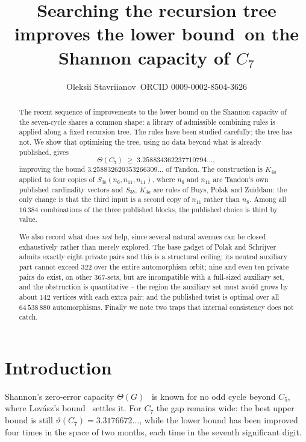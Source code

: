 \documentclass[11pt]{article}
\title{Searching the recursion tree improves the lower bound\ on the Shannon capacity of $C_7$}
\author{Oleksii Stavriianov\ \small ORCID 0009-0002-8504-3626}
\date{}
\theoremstyle{definition}
\begin{document}
\maketitle

\begin{abstract}
The recent sequence of improvements to the lower bound on the Shannon capacity of the seven-cycle
shares a common shape: a library of admissible combining rules is applied along a fixed recursion
tree. The rules have been studied carefully; the tree has not. We show that optimising the tree,
using no data beyond what is already published, gives
\[
  \Theta(C_7) \;\ge\; 3.258834362237710794\ldots,
\]
improving the bound $3.258832620353266309\ldots$ of Tandon. The construction is
$K_{4a}$ applied to four copies of $S_{3b}(n_6, n_{11}, n_{11})$, where $n_6$ and $n_{11}$ are
Tandon's own published cardinality vectors and $S_{3b}$, $K_{4a}$ are rules of Buys, Polak and
Zuiddam: the only change is that the third input is a second copy of $n_{11}$ rather than $n_8$.
Among all $16\,384$ combinations of the three published blocks, the published choice is third
by value.

We also record what does \emph{not} help, since several natural avenues can be closed
exhaustively rather than merely explored. The base gadget of Polak and Schrijver admits exactly
eight private pairs and this is a structural ceiling; its neutral auxiliary part cannot exceed
$322$ over the entire automorphism orbit; nine and even ten private pairs do exist, on other
$367$-sets, but are incompatible with a full-sized auxiliary set, and the obstruction is
quantitative -- the region the auxiliary set must avoid grows by about $142$ vertices with each
extra pair; and the published twist is optimal over all $64\,538\,880$ automorphisms. Finally we note two traps that
internal consistency does not catch.
\end{abstract}

\section{Introduction}

Shannon's zero-error capacity $\Theta(G)$~\cite{Shannon} is known for no odd cycle beyond $C_5$, where
Lov\'asz's bound~\cite{Lovasz} settles it. For $C_7$ the gap remains wide: the best upper bound is still
$\vartheta(C_7) = 3.3176672\ldots$, while the lower bound has been improved four times in the
space of two months, each time in the seventh significant digit.
\end{document}
